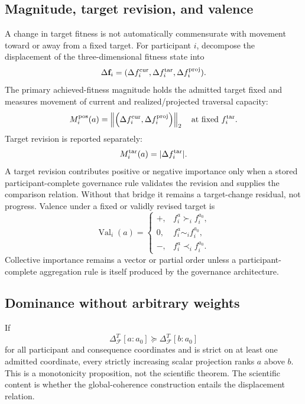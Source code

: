 \documentclass[11pt]{article}
\newcommand{\F}{\mathcal{F}}
\begin{document}
\subsection{Magnitude, target revision, and valence}

A change in target fitness is not automatically commensurate with movement toward or away from a fixed target. For participant $i$, decompose the displacement of the three-dimensional fitness state into
\begin{equation}
\Delta\mathbf f_i=(\Delta f_i^{\rm cur},\Delta f_i^{\rm tar},\Delta f_i^{\rm proj}).
\end{equation}
The primary achieved-fitness magnitude holds the admitted target fixed and measures movement of current and realized/projected traversal capacity:
\begin{equation}
M_i^{\rm pos}(a)=\left\|\left(\Delta f_i^{\rm cur},\Delta f_i^{\rm proj}\right)\right\|_2\quad\text{at fixed }f_i^{\rm tar}.
\end{equation}
Target revision is reported separately:
\begin{equation}
M_i^{\rm tar}(a)=|\Delta f_i^{\rm tar}|.
\end{equation}
A target revision contributes positive or negative importance only when a stored participant-complete governance rule validates the revision and supplies the comparison relation. Without that bridge it remains a target-change residual, not progress. Valence under a fixed or validly revised target is
\begin{equation}
\operatorname{Val}_i(a)=
\begin{cases}
+,&f_i^a\succ_i f_i^{a_0},\\
0,&f_i^a\sim_i f_i^{a_0},\\
-,&f_i^a\prec_i f_i^{a_0}.
\end{cases}
\end{equation}
Collective importance remains a vector or partial order unless a participant-complete aggregation rule is itself produced by the governance architecture.

\subsection{Dominance without arbitrary weights}

If
\begin{equation}
\Delta_{\F}^{T}[a:a_0]\succeq\Delta_{\F}^{T}[b:a_0]
\end{equation}
for all participant and consequence coordinates and is strict on at least one admitted coordinate, every strictly
increasing scalar projection ranks $a$ above $b$. This is a monotonicity proposition, not the scientific theorem. The
scientific content is whether the global-coherence construction entails the displacement relation.
\end{document}

